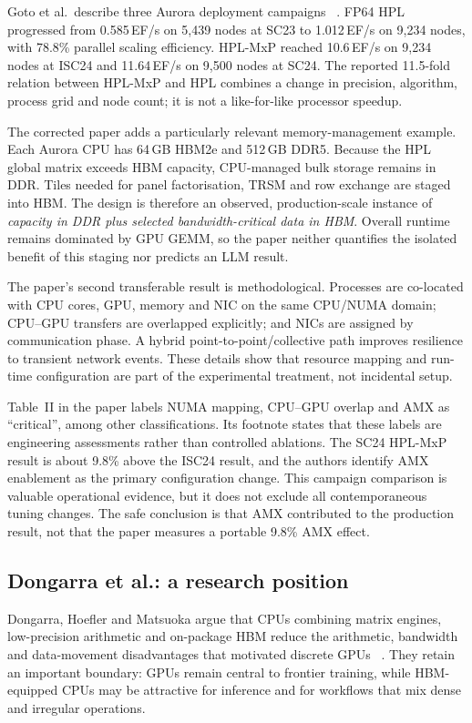 Goto et al.\ describe three Aurora deployment campaigns
~\cite{goto2026aurorahpl}.  FP64 HPL progressed from 0.585\,EF/s on
5,439 nodes at SC23 to 1.012\,EF/s on 9,234 nodes, with 78.8\%
parallel scaling efficiency.  HPL-MxP reached 10.6\,EF/s on 9,234
nodes at ISC24 and 11.64\,EF/s on 9,500 nodes at SC24.  The reported
11.5-fold relation between HPL-MxP and HPL combines a change in
precision, algorithm, process grid and node count; it is not a
like-for-like processor speedup.

The corrected paper adds a particularly relevant memory-management
example.  Each Aurora CPU has 64\,GB HBM2e and 512\,GB DDR5.  Because
the HPL global matrix exceeds HBM capacity, CPU-managed bulk storage
remains in DDR.  Tiles needed for panel factorisation, TRSM and row
exchange are staged into HBM.  The design is therefore an observed,
production-scale instance of \emph{capacity in DDR plus selected
bandwidth-critical data in HBM}.  Overall runtime remains dominated by
GPU GEMM, so the paper neither quantifies the isolated benefit of this
staging nor predicts an LLM result.

The paper's second transferable result is methodological.  Processes
are co-located with CPU cores, GPU, memory and NIC on the same CPU/NUMA
domain; CPU--GPU transfers are overlapped explicitly; and NICs are
assigned by communication phase.  A hybrid point-to-point/collective
path improves resilience to transient network events.  These details
show that resource mapping and run-time configuration are part of the
experimental treatment, not incidental setup.

Table~II in the paper labels NUMA mapping, CPU--GPU overlap and AMX as
``critical'', among other classifications.  Its footnote states that
these labels are engineering assessments rather than controlled
ablations.  The SC24 HPL-MxP result is about 9.8\% above the ISC24
result, and the authors identify AMX enablement as the primary
configuration change.  This campaign comparison is valuable operational
evidence, but it does not exclude all contemporaneous tuning changes.
The safe conclusion is that AMX contributed to the production result,
not that the paper measures a portable 9.8\% AMX effect.

\subsection{Dongarra et al.: a research position}
\label{sec:dongarra-critical}

Dongarra, Hoefler and Matsuoka argue that CPUs combining matrix engines,
low-precision arithmetic and on-package HBM reduce the arithmetic,
bandwidth and data-movement disadvantages that motivated discrete GPUs
~\cite{dongarra2026gpus}.  They retain an important boundary: GPUs
remain central to frontier training, while HBM-equipped CPUs may be
attractive for inference and for workflows that mix dense and irregular
operations.

